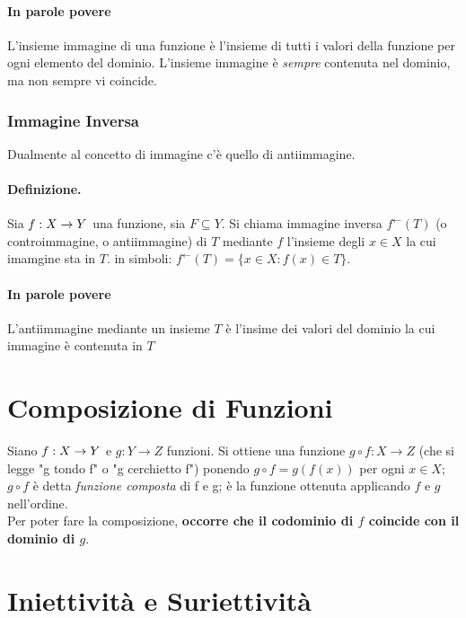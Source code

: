 \documentclass[12pt, a4paper, openany]{book}
\begin{document}
\paragraph{In parole povere} L'insieme immagine di una funzione è l'insieme di tutti i valori della funzione per ogni elemento del dominio.
L'insieme immagine è \emph{sempre} contenuta nel dominio, ma non sempre vi coincide.

\subsubsection{Immagine Inversa}
Dualmente al concetto di immagine c'è quello di antiimmagine.
\paragraph{Definizione. }Sia $f: X \rightarrow Y $ una funzione, sia $F \subseteq Y$.
Si chiama immagine inversa $f^\leftarrow(T)$ (o controimmagine, o antiimmagine) di $T$ mediante $f$ l'insieme degli $x \in X$ la cui imamgine sta in $T$.
in simboli: $f^\leftarrow(T) = \{ x \in X : f(x) \in T\}$.
\paragraph{In parole povere} L'antiimmagine mediante un insieme $T$ è l'insime dei valori del dominio la cui immagine è contenuta in $T$


\section{Composizione di Funzioni} 
Siano $f: X \rightarrow Y$ e $g: Y \rightarrow Z$ funzioni.
Si ottiene una funzione $g \circ f : X \rightarrow Z $ (che si legge "g tondo f" o "g cerchietto f") ponendo $g \circ f = g(f(x))$ per ogni $x \in X$;
$g \circ f$ è detta \emph{funzione composta} di f e g; è la funzione ottenuta applicando $f$ e $g$ nell'ordine.
\\Per poter fare la composizione, \textbf{occorre che il codominio di $f$ coincide con il dominio di $g$}.


\section{Iniettività e Suriettività}
\end{document}
